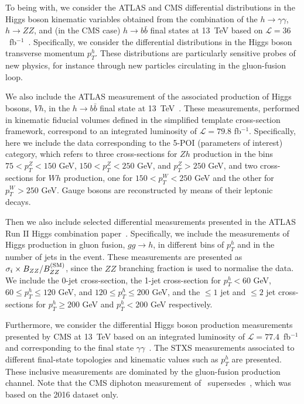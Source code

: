 

To being with, we consider the ATLAS and CMS differential distributions
in the Higgs boson kinematic variables obtained from the combination of the
$h\to \gamma\gamma$, $h\to ZZ$, and (in the CMS case)
$h \to b\bar{b}$ final states at 13~TeV based
on $\mathcal{L}=36$~fb$^{-1}$~\cite{Aaboud:2018ezd,Sirunyan:2018sgc}.
Specifically, we consider the differential distributions in the Higgs boson
transverse momentum $p_T^h$.
%
These distributions are particularly
sensitive probes of new physics, for instance through new particles circulating
in the gluon-fusion loop.

We also include the ATLAS measurement of the associated production of Higgs
bosons, $Vh$, in the $h\to b\bar{b}$ final state at
13~TeV~\cite{Aaboud:2019nan}.
%
These measurements, performed in kinematic
fiducial volumes defined in the simplified template cross-section framework,
correspond to an integrated luminosity of $\mathcal{L}=79.8$ fb$^{-1}$.
Specifically, here we include the data corresponding to the 5-POI
(parameters of interest) category, which refers to three cross-sections
for $Zh$ production in the bins $75 < p_T^Z < 150$ GeV,
$150 < p_T^Z < 250$ GeV, and $p_T^Z > 250$ GeV, and two cross-sections
for $Wh$ production, one for $150 < p_T^W < 250$ GeV and the other for
$p_T^W > 250$ GeV. Gauge bosons are reconstructed by means of their leptonic
decays.

Then we also include selected differential measurements presented in the ATLAS
Run II Higgs combination paper~\cite{Aad:2019mbh}.
Specifically, we include the measurements of Higgs production
in gluon fusion, $gg \to h$, in different bins of
$p_T^h$ and in the number of jets in the event.
These measurements are presented as $\sigma_i \times B_{ZZ}/B_{ZZ}^{\rm (SM)}$,
since the $ZZ$ branching fraction is used to normalise the data.
We include the 0-jet cross-section, the 1-jet cross-section
for $p_T^h < 60$ GeV, $60 \le p_T^h \le 120$ GeV, and
$120 \le p_T^h \le 200$ GeV, and the $\le 1$ jet and $\le 2$ jet cross-sections
for $p_T^h \ge 200$ GeV and $p_T^h<200$ GeV respectively.

Furthermore, we consider the differential Higgs boson production measurements
presented by CMS at 13~TeV based on an integrated luminosity of
$\mathcal{L}=77.4$~fb$^{-1}$ and corresponding to the final state
$\gamma\gamma$~\cite{CMS:1900lgv}.
The STXS measurements associated to different final-state topologies
and kinematic values such as $p_T^h$ are presented.
These inclusive measurements are dominated by the gluon-fusion production
channel. Note that the CMS diphoton measurement of~\cite{CMS:1900lgv}
supersedes~\cite{Aaboud:2018xdt}, which was based on the 2016 dataset only.


